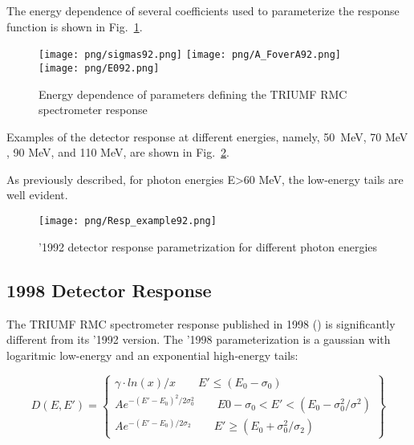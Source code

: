 The energy dependence of several coefficients used to parameterize the response
function is shown in Fig.~\ref{fig:parameterDependence}.

\begin{figure}[!h]
  \begin{center}
    \texttt{[image: png/sigmas92.png]} 
    \texttt{[image: png/A\_FoverA92.png]} 
    \texttt{[image: png/E092.png]} 
  \end{center}
  \caption{
    Energy dependence of parameters defining the TRIUMF RMC spectrometer response
    \cite{RMC_1992_PhysRevC.46.1094}
  }
  \label{fig:parameterDependence}
\end{figure}

Examples of the detector response at different energies, namely, \mbox{50 MeV},
70 MeV , 90 MeV, and 110 MeV, are shown in Fig.~\ref{fig:92ResponseExample}.

As previously described, for photon energies E>60 MeV, the low-energy tails are well evident.

\begin{figure}[!h]
\centering
\texttt{[image: png/Resp\_example92.png]}
\caption{'1992 detector response parametrization for different photon energies}
\label{fig:92ResponseExample}
\end{figure}


\subsection { 1998 Detector Response }

The TRIUMF RMC spectrometer response published in 1998 (\cite{RMC_1998_PhysRevC.58.1767})
is significantly different from its '1992 version.
The '1998 parameterization is a gaussian with logaritmic low-energy and an exponential
high-energy tails:

\begin{equation}
  D(E,E')= \left\{
    \begin{array}{ll}
      \gamma \cdot ln(x)/x    \qquad E' \leq (E_0-\sigma_0) \\
      Ae^{-(E'-E_0)^2/2\sigma_0^2} \qquad E0-\sigma_0<E'<(E_0-\sigma_0^2/\sigma^2) \\
      Ae^{-(E'-E_0)/2\sigma_2}    \qquad E' \geq (E_0+\sigma_0^2/\sigma_2)
    \end{array}
  \right\}
\end{equation}

